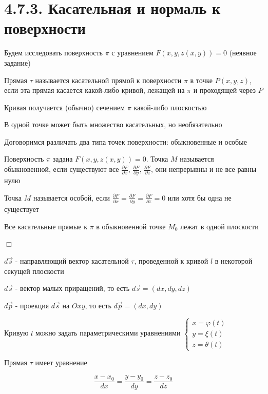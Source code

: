 \documentclass[12pt]{article}
\begin{document}
    \section{4.7.3. Касательная и нормаль к поверхности}

    Будем исследовать поверхность $\pi$ с уравнением $F(x, y, z(x, y)) = 0$ (неявное задание)

    \Def Прямая $\tau$ называется касательной прямой к поверхности $\pi$ в точке $P(x, y, z)$,
    если эта прямая касается какой-либо кривой, лежащей на $\pi$ и проходящей через $P$

    \Nota Кривая получается (обычно) сечением $\pi$ какой-либо плоскостью

    \Nota В одной точке может быть множество касательных, но необязательно

    \Nota Договоримся различать два типа точек поверхности: обыкновенные и особые

    \Def Поверхность $\pi$ задана $F(x, y, z(x, y)) = 0$. Точка $M$ называется обыкновенной, если существуют
    все $\frac{\partial F}{\partial x}$, $\frac{\partial F}{\partial y}$, $\frac{\partial F}{\partial z}$,
    они непрерывны и не все равны нулю

    \Def Точка $M$ называется особой, если $\frac{\partial F}{\partial x} = \frac{\partial F}{\partial y} = \frac{\partial F}{\partial z} = 0$
    или хотя бы одна не существует

    \Th Все касательные прямые к $\pi$ в обыкновенной точке $M_0$ лежат в одной плоскости

    $\Box$

    $d \overrightarrow{s}$ - направляющий вектор касательной $\tau$, проведенной к кривой $l$ в некоторой секущей плоскости

    $d \overrightarrow{s}$ - вектор малых приращений, то есть $d \overrightarrow{s} = (dx, dy, dz)$

    $d \overrightarrow{p}$ - проекция $d \overrightarrow{s}$ на $Oxy$, то есть $d \overrightarrow{p} = (dx, dy)$

    Кривую $l$ можно задать параметрическими уравнениями $\begin{cases}x = \varphi(t) \\ y = \xi(t) \\ z = \theta(t)\end{cases}$

    Прямая $\tau$ имеет уравнение

    \[\frac{x - x_0}{dx} = \frac{y - y_0}{dy} = \frac{z - z_0}{dz}\]
\end{document}
